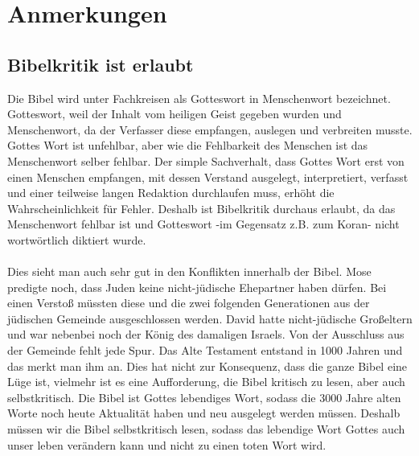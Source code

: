 \chapter{Anmerkungen}
\section{Bibelkritik ist erlaubt}
Die Bibel wird unter Fachkreisen als Gotteswort in Menschenwort bezeichnet. Gotteswort, weil der Inhalt vom heiligen Geist gegeben wurden und Menschenwort, da der Verfasser diese empfangen, auslegen und verbreiten musste. Gottes Wort ist unfehlbar, aber wie die Fehlbarkeit des Menschen ist das Menschenwort selber fehlbar. Der simple Sachverhalt, dass Gottes Wort erst von einen Menschen empfangen, mit dessen Verstand ausgelegt, interpretiert, verfasst und einer teilweise langen Redaktion durchlaufen muss, erhöht die Wahrscheinlichkeit für Fehler. Deshalb ist Bibelkritik durchaus erlaubt, da das Menschenwort fehlbar ist und Gotteswort -im Gegensatz z.B. zum Koran- nicht wortwörtlich diktiert wurde.
\\~\\
Dies sieht man auch sehr gut in den Konflikten innerhalb der Bibel. Mose predigte noch, dass Juden keine nicht-jüdische Ehepartner haben dürfen. Bei einen Verstoß müssten diese und die zwei folgenden Generationen aus der jüdischen Gemeinde ausgeschlossen werden. David hatte nicht-jüdische Großeltern und war nebenbei noch der König des damaligen Israels. Von der Ausschluss aus der Gemeinde fehlt jede Spur. Das Alte Testament entstand in  1000 Jahren und das merkt man ihm an. Dies hat nicht zur Konsequenz, dass die ganze Bibel eine Lüge ist, vielmehr ist es eine Aufforderung, die Bibel kritisch zu lesen, aber auch selbstkritisch. Die Bibel ist Gottes lebendiges Wort, sodass die 3000 Jahre alten Worte noch heute Aktualität haben und neu ausgelegt werden müssen. Deshalb müssen wir die Bibel selbstkritisch lesen, sodass das lebendige Wort Gottes auch unser leben verändern kann und nicht zu einen toten Wort wird.

